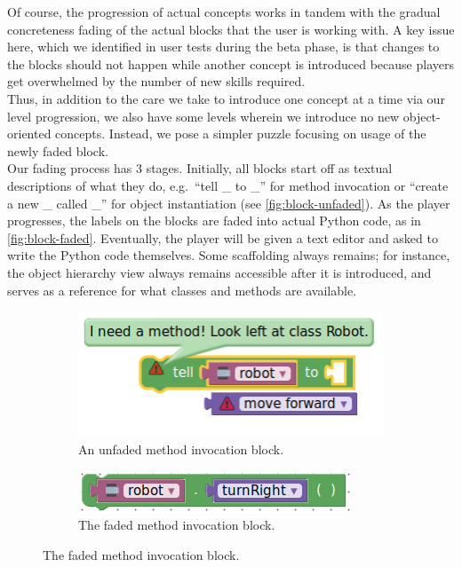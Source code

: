\documentclass[12pt,notitlepage]{article}
\begin{document}
Of course, the progression of actual concepts works in tandem with the
gradual concreteness fading of the actual blocks that the user is
working with. A key issue here, which we identified in user tests during
the beta phase, is that changes to the blocks should not happen while
another concept is introduced because players get overwhelmed by the
number of new skills required.\\

Thus, in addition to the care we take to introduce one concept at a
time via our level progression, we also have some levels wherein we
introduce no new object-oriented concepts. Instead, we pose a simpler
puzzle focusing on usage of the newly faded block.\\

Our fading process has 3 stages. Initially, all blocks start off as 
textual descriptions of what they do, e.g.\ ``tell \_ to \_'' for 
method invocation or ``create a new \_ called \_'' for object 
instantiation (see \autoref{fig:block-unfaded}). As the player 
progresses, the labels on the blocks are faded into actual Python code, 
as in \autoref{fig:block-faded}. Eventually, the player will be given 
a text editor and asked to write the Python code themselves. Some 
scaffolding always remains; for instance, the object hierarchy view always 
remains accessible after it is introduced, and serves as a reference for 
what classes and methods are available.

\begin{figure}[h]
\centering
\begin{subfigure}{.5\textwidth}
  \centering
  \includegraphics[width=.5\textwidth]{block_unfaded}
  \caption{An unfaded method invocation block.}\label{fig:block-unfaded}
\end{subfigure}%
\begin{subfigure}{.5\textwidth}
  \centering
  \includegraphics[width=.5\textwidth]{block_faded}
  \caption{The faded method invocation block.}\label{fig:block-faded}
\end{subfigure}
\label{fig:test}
\end{figure}
\end{document}
